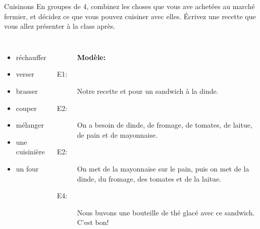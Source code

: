 \begin{frame}{Cuisinons}
  En groupes de 4, combinez les choses que vous ave achetées au marché fermier, et décidez ce que vous pouvez cuisiner avec elles.
  Écrivez une recette que vous allez présenter à la class après.
  \begin{columns}
      \begin{itemize}
        \item réchauffer 
        \item verser 
        \item brasser 
        \item couper 
        \item mélanger 
        \item une cuisinière 
        \item un four 
      \end{itemize}
      \begin{description}
        \item[] \textbf{Modèle:}
        \item[E1:] Notre recette et pour un sandwich à la dinde.
        \item[E2:] On a besoin de dinde, de fromage, de tomates, de laitue, de pain et de mayonnaise.
        \item[E2:] On met de la mayonnaise sur le pain, puis on met de la dinde, du fromage, des tomates et de la laitue.
        \item[E4:] Nous buvons une bouteille de thé glacé avec ce sandwich. C'est bon!
      \end{description}
  \end{columns}
\end{frame}